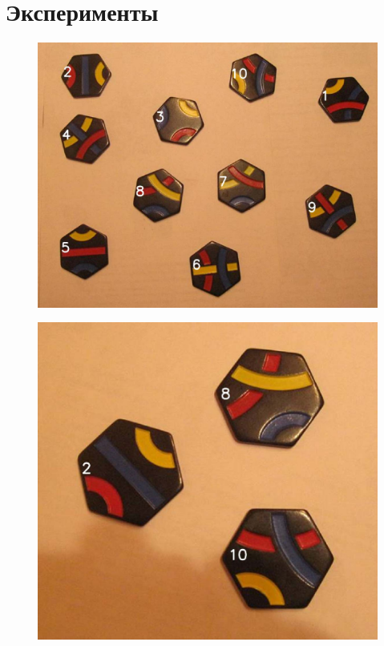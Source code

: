 \documentclass[10pt]{article}
\begin{document}
	
	\section*{Эксперименты}
	
	
	\begin{figure}[h]
		{
		\begin{minipage}[h]{0.47\linewidth}
			\begin{center}
				{\includegraphics[width=1.0\linewidth]{data/result-3.pdf}}
			\end{center}
		\end{minipage}
	    \hfill
	    \begin{minipage}[h]{0.4\linewidth}
	    	\begin{center}
	    		{\includegraphics[width=1.0\linewidth]{data/result-4.pdf}}
	    	\end{center}
	    \end{minipage}
	    }
        \vfill
		

\end{figure}
\end{document}
